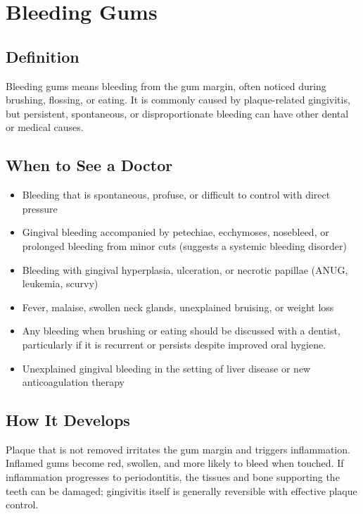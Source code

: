 \chapter{Bleeding Gums}

\section*{Definition}
Bleeding gums means bleeding from the gum margin, often noticed during brushing, flossing, or eating. It is commonly caused by plaque-related gingivitis, but persistent, spontaneous, or disproportionate bleeding can have other dental or medical causes.

\section*{When to See a Doctor}

\begin{itemize}
 \item Bleeding that is spontaneous, profuse, or difficult to control with direct pressure
 \item Gingival bleeding accompanied by petechiae, ecchymoses, nosebleed, or prolonged bleeding from minor cuts (suggests a systemic bleeding disorder)
 \item Bleeding with gingival hyperplasia, ulceration, or necrotic papillae (ANUG, leukemia, scurvy)
 \item Fever, malaise, swollen neck glands, unexplained bruising, or weight loss
 \item Any bleeding when brushing or eating should be discussed with a dentist, particularly if it is recurrent or persists despite improved oral hygiene.
 \item Unexplained gingival bleeding in the setting of liver disease or new anticoagulation therapy
\end{itemize}

\section*{How It Develops}
Plaque that is not removed irritates the gum margin and triggers inflammation. Inflamed gums become red, swollen, and more likely to bleed when touched. If inflammation progresses to periodontitis, the tissues and bone supporting the teeth can be damaged; gingivitis itself is generally reversible with effective plaque control.

